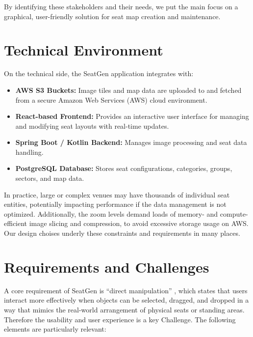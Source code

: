 By identifying these stakeholders and their needs, we put the main focus on a graphical, user-friendly solution for seat map creation and maintenance.

\section{Technical Environment}
On the technical side, the SeatGen application integrates with:
\begin{itemize}
    \item \textbf{AWS S3 Buckets:} Image tiles and map data are uploaded to and fetched from a secure Amazon Web Services (AWS) cloud environment.
    \item \textbf{React-based Frontend:} Provides an interactive user interface for managing and modifying seat layouts with real-time updates.  
    \item \textbf{Spring Boot / Kotlin Backend:} Manages image processing and seat data handling.  
    \item \textbf{PostgreSQL Database:} Stores seat configurations, categories, groups, sectors, and map data.  
\end{itemize}

In practice, large or complex venues may have thousands of individual seat entities, potentially impacting performance if the data management is not optimized. Additionally, the zoom levels demand loads of memory- and compute-efficient image slicing and compression, to avoid excessive storage usage on AWS. Our design choises underly these constraints and requirements in many places.

\section{Requirements and Challenges}
A core requirement of SeatGen is “direct manipulation” \cite{Hutchins01121985}, which states that users interact more effectively when objects can be selected, dragged, and dropped in a way that mimics the real-world arrangement of physical seats or standing areas. Therefore the usability and user experience is a key Challenge. The following elements are particularly relevant:

